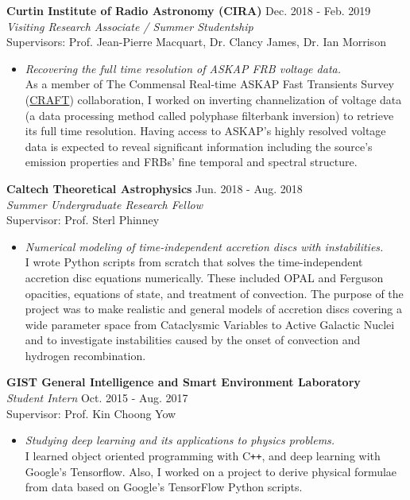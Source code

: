 \documentclass[margin, 10pt]{res} %
\begin{document}
\begin{resume}
{\bf Curtin Institute of Radio Astronomy (CIRA)} \hfill Dec. 2018 - Feb. 2019 \\
{\sl Visiting Research Associate / Summer Studentship} \\
Supervisors: Prof. Jean-Pierre Macquart, Dr. Clancy James, Dr. Ian Morrison
\begin{itemize}
\item[] {\sl Recovering the full time resolution of ASKAP FRB voltage data.}\\
As a member of The Commensal Real-time ASKAP Fast Transients Survey (\href{http://astronomy.curtin.edu.au/research/craft/}{CRAFT}) collaboration, I worked on inverting channelization of voltage data (a data processing method called polyphase filterbank inversion) to retrieve its full time resolution. Having access to ASKAP's highly resolved voltage data is expected to reveal significant information including the source's emission properties and FRBs' fine temporal and spectral structure.
\end{itemize} 

{\bf Caltech Theoretical Astrophysics} \hfill Jun. 2018 - Aug. 2018 \\
{\sl Summer Undergraduate Research Fellow} \\
Supervisor: Prof. Sterl Phinney
\begin{itemize}
\item[] {\sl Numerical modeling of time-independent accretion discs with instabilities.}\\
I wrote Python scripts from scratch that solves the time-independent accretion disc equations numerically. These included OPAL and Ferguson opacities, equations of state, and treatment of convection. The purpose of the project was to make realistic and general models of accretion discs covering a wide parameter space from Cataclysmic Variables to Active Galactic Nuclei and to investigate instabilities caused by the onset of convection and hydrogen recombination.
\end{itemize} 

{\bf GIST General Intelligence and Smart Environment Laboratory}\\
{\sl Student Intern} \hfill Oct. 2015 - Aug. 2017 \\
Supervisor: Prof. Kin Choong Yow
\begin{itemize}
\item[] {\sl Studying deep learning and its applications to physics problems.}\\
I learned object oriented programming with C\texttt{++}, and deep learning with Google's Tensorflow. Also, I worked on a project to derive physical formulae from data based on Google's TensorFlow Python scripts.
\end{itemize} 


\end{resume}
\end{document}
